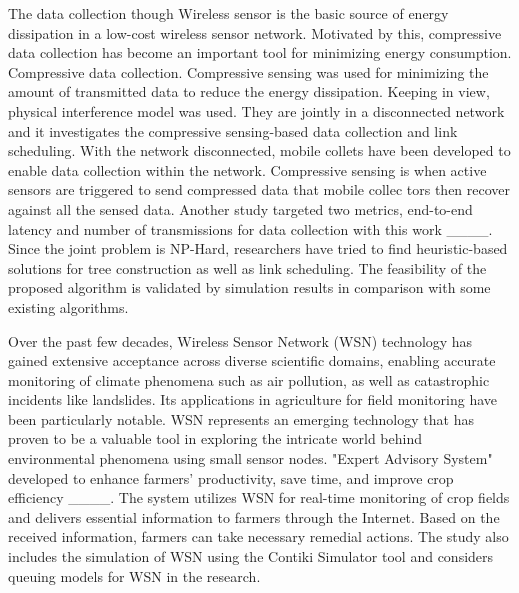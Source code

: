 The data collection though Wireless sensor is the basic source of energy dissipation in a low-cost wireless sensor network. Motivated by this, compressive data collection has become an important tool for minimizing energy consumption. Compressive data collection. Compressive sensing was used for minimizing the amount of transmitted data to reduce the energy dissipation. Keeping in view, physical interference model was used. They are jointly in a disconnected network and it investigates the compressive sensing-based data collection and link scheduling. With the network disconnected, mobile collets have been developed to enable data collection within the network. Compressive sensing is when active sensors are triggered to send compressed data that mobile collec tors then recover against all the sensed data. Another study targeted two metrics, end-to-end latency and number of transmissions for data collection with this work ____. Since the joint problem is NP-Hard, researchers have tried to find heuristic-based solutions for tree construction as well as link scheduling. The feasibility of the proposed algorithm is validated by simulation results in comparison with some existing algorithms.

Over the past few decades, Wireless Sensor Network (WSN) technology has gained extensive acceptance across diverse scientific domains, enabling accurate monitoring of climate phenomena such as air pollution, as well as catastrophic incidents like landslides. Its applications in agriculture for field monitoring have been particularly notable. WSN represents an emerging technology that has proven to be a valuable tool in exploring the intricate world behind environmental phenomena using 
small sensor nodes. "Expert Advisory System" developed to enhance farmers' productivity, save time, and improve crop efficiency ____. The system utilizes WSN for real-time monitoring of crop fields and delivers essential information to farmers through the Internet. Based on the received information, farmers can take necessary remedial actions. The study also includes the simulation of WSN using the Contiki Simulator tool and considers queuing models for WSN in the research.

